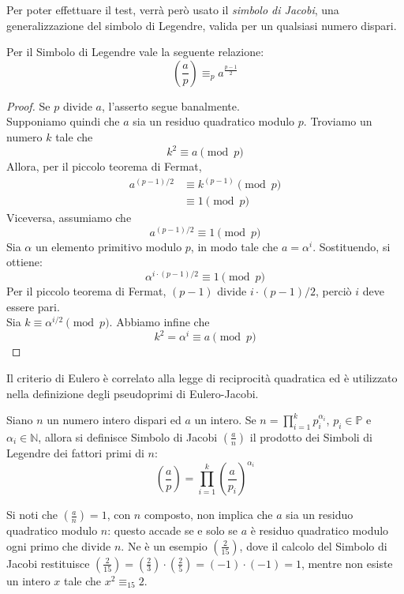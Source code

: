 Per poter effettuare il test, verrà però usato il \emph{simbolo di Jacobi}, una generalizzazione del simbolo di Legendre, valida per un qualsiasi numero dispari.

\begin{teorema}
	\label{th:Eulero}
	Per il Simbolo di Legendre vale la seguente relazione:
	\begin{equation*}
		\left( \frac{a}{p} \right) \equiv_p a^{\frac{p-1}{2}}
	\end{equation*}
\end{teorema}

\begin{proof}
	Se $p$ divide $a$, l'asserto segue banalmente.\\
	Supponiamo quindi che $a$ sia un residuo quadratico modulo $p$. Troviamo un numero $k$ tale che \[ k^2 \equiv a \pmod{p} \]
	Allora, per il piccolo teorema di Fermat,
		\begin{align*}
			a^{(p-1) / 2} &\equiv k^{(p-1)} \pmod{p}\\
			&\equiv 1 \pmod{p}
		\end{align*}
	Viceversa, assumiamo che \[ a^{(p-1) / 2} \equiv 1 \pmod{p} \]
	Sia $\alpha$ un elemento primitivo modulo $p$, in modo tale che $a = \alpha^i$.
	Sostituendo, si ottiene: \[ \alpha^{i \cdot (p-1) / 2} \equiv 1 \pmod{p} \]
	Per il piccolo teorema di Fermat, $(p - 1)$ divide $i \cdot (p - 1)/2$, perciò $i$ deve essere pari.\\
	Sia $k \equiv \alpha^{i/2} \pmod{p}$. Abbiamo infine che \[ k^2 = \alpha^i \equiv a \pmod{p} \]
\end{proof}

Il criterio di Eulero è correlato alla legge di reciprocità quadratica ed è utilizzato nella definizione degli pseudoprimi di Eulero-Jacobi.

\begin{definizione}
	Siano $n$ un numero intero dispari ed $a$ un intero. Se $n = \prod_{i = 1}^{k} p_i^{\alpha_i}$, $p_i \in \mathbb{P}$ e $\alpha_i \in \mathbb{N}$, allora si definisce Simbolo di Jacobi $\left( \frac{a}{n} \right)$ il prodotto dei Simboli di Legendre dei fattori primi di $n$: \[ \left( \frac{a}{p} \right) = \displaystyle\prod_{i=1}^{k} \left( \frac{a}{p_i} \right)^{\alpha_i} \]
\end{definizione}

Si noti che $\left( \frac{a}{n} \right) = 1$, con $n$ composto, non implica che $a$ sia un residuo quadratico modulo $n$: questo accade se e solo se $a$ è residuo quadratico modulo ogni primo che divide $n$. Ne è un esempio $\left( \frac{2}{15} \right)$, dove il calcolo del Simbolo di Jacobi restituisce $\left( \frac{2}{15} \right)= \left( \frac{2}{3} \right) \cdot \left( \frac{2}{5} \right) = \left( -1 \right) \cdot \left( -1 \right) = 1$, mentre non esiste un intero $x$ tale che $x^2 \equiv_{15} 2$.%

